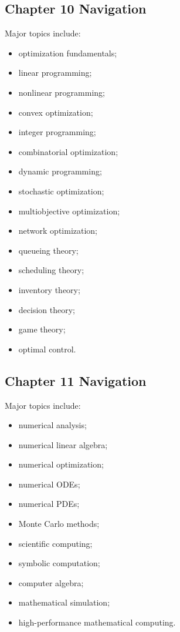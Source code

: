 \subsection{Chapter 10 Navigation}
\label{subsec:index-chapter-ten}

Major topics include:

\begin{itemize}
    \item optimization fundamentals;
    \item linear programming;
    \item nonlinear programming;
    \item convex optimization;
    \item integer programming;
    \item combinatorial optimization;
    \item dynamic programming;
    \item stochastic optimization;
    \item multiobjective optimization;
    \item network optimization;
    \item queueing theory;
    \item scheduling theory;
    \item inventory theory;
    \item decision theory;
    \item game theory;
    \item optimal control.
\end{itemize}

\subsection{Chapter 11 Navigation}
\label{subsec:index-chapter-eleven}

Major topics include:

\begin{itemize}
    \item numerical analysis;
    \item numerical linear algebra;
    \item numerical optimization;
    \item numerical ODEs;
    \item numerical PDEs;
    \item Monte Carlo methods;
    \item scientific computing;
    \item symbolic computation;
    \item computer algebra;
    \item mathematical simulation;
    \item high-performance mathematical computing.
\end{itemize}

